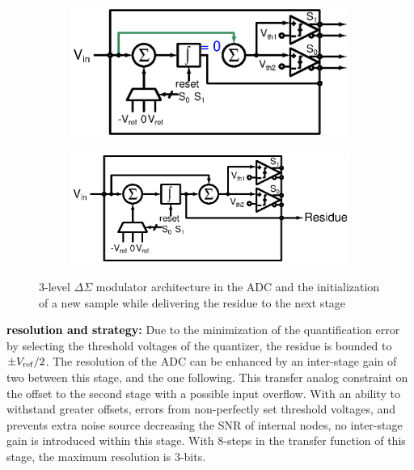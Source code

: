 \begin{figure}[htp]
	\centering
	\begin{subfigure}[b]{0.48\textwidth}
		\centering
		\includegraphics[width=\textwidth]{Chapter4/Figs/isd-principle-reset.ps}
		\label{fig:isd-alone-reset-clk-cycle}
	\end{subfigure}
	\begin{subfigure}[b]{0.48\textwidth}
		\centering
		\includegraphics[width=\textwidth]{Chapter4/Figs/isd-principle.ps}
		\label{fig:isd-alone-std-clk-cycle}
	\end{subfigure}
	\caption{3-level \(\Delta\Sigma \) modulator architecture in the ADC and the initialization of a new sample while delivering the
	residue to the next stage}
	\label{fig:isd-alone-clk-cycle}
\end{figure}

\textbf{\textcolor{black}{resolution and strategy:}}
Due to the minimization of the quantification error by selecting the threshold voltages of the quantizer, the residue is bounded to $\pm V_{\rm ref}/2$. The resolution of the ADC can be enhanced by an inter-stage gain of two between this stage, and the one following. This transfer analog constraint on the offset to the second stage with a possible input overflow. With an ability to withstand greater offsets, errors from non-perfectly set threshold voltages, and prevents extra noise source decreasing the SNR of internal nodes, no inter-stage gain is introduced within this stage. With 8-steps in the transfer function of this stage, the maximum resolution is 3-bits.

